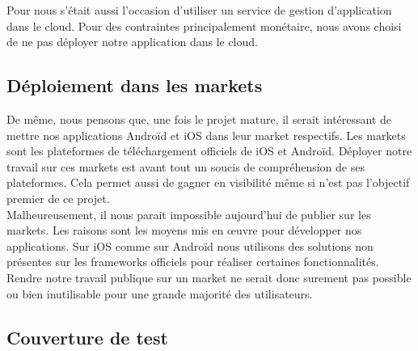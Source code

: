 Pour nous s'était aussi l'occasion d'utiliser un service de gestion d'application dans le cloud. Pour des contraintes
principalement monétaire, nous avons choisi de ne pas déployer notre application dans le cloud.




\subsection{Déploiement dans les markets}

De même, nous pensons que, une fois le projet mature, il serait intéressant de mettre nos applications Androïd et iOS dans 
leur market respectifs. Les markets sont les plateformes de téléchargement officiels de iOS et Androïd. Déployer notre 
travail sur ces markets est avant tout un soucis de compréhension de ses plateformes. Cela permet aussi de gagner en visibilité
même si n'est pas l'objectif premier de ce projet.
\\
Malheureusement, il nous parait impossible aujourd'hui de publier sur les markets. Les raisons sont les moyens mis en œuvre 
pour développer nos applications. Sur iOS comme sur Androïd nous utilisons des solutions non présentes sur les frameworks officiels
pour réaliser certaines fonctionnalités. Rendre notre travail publique sur un market ne serait donc surement pas possible ou bien
inutilisable pour une grande majorité des utilisateurs.




\subsection{Couverture de test}

